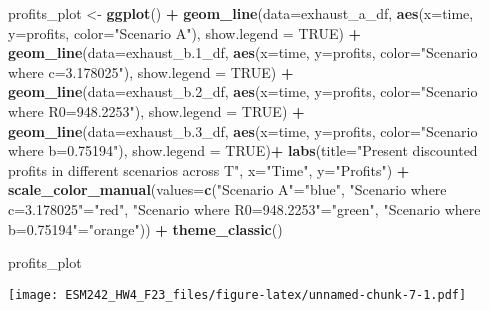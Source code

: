 \documentclass[
]{article}
\newenvironment{Shaded}{\begin{snugshade}}{\end{snugshade}}
\newcommand{\AttributeTok}[1]{\textcolor[rgb]{0.13,0.29,0.53}{#1}}
\newcommand{\ConstantTok}[1]{\textcolor[rgb]{0.56,0.35,0.01}{#1}}
\newcommand{\FloatTok}[1]{\textcolor[rgb]{0.00,0.00,0.81}{#1}}
\newcommand{\FunctionTok}[1]{\textcolor[rgb]{0.13,0.29,0.53}{\textbf{#1}}}
\newcommand{\NormalTok}[1]{#1}
\newcommand{\OtherTok}[1]{\textcolor[rgb]{0.56,0.35,0.01}{#1}}
\newcommand{\SpecialCharTok}[1]{\textcolor[rgb]{0.81,0.36,0.00}{\textbf{#1}}}
\newcommand{\StringTok}[1]{\textcolor[rgb]{0.31,0.60,0.02}{#1}}
\begin{document}
\begin{Shaded}
\begin{Highlighting}[]
\NormalTok{profits\_plot }\OtherTok{\textless{}{-}} \FunctionTok{ggplot}\NormalTok{() }\SpecialCharTok{+} 
  \FunctionTok{geom\_line}\NormalTok{(}\AttributeTok{data=}\NormalTok{exhaust\_a\_df, }\FunctionTok{aes}\NormalTok{(}\AttributeTok{x=}\NormalTok{time, }\AttributeTok{y=}\NormalTok{profits, }\AttributeTok{color=}\StringTok{"Scenario A"}\NormalTok{), }\AttributeTok{show.legend =} \ConstantTok{TRUE}\NormalTok{) }\SpecialCharTok{+}
  \FunctionTok{geom\_line}\NormalTok{(}\AttributeTok{data=}\NormalTok{exhaust\_b}\FloatTok{.1}\NormalTok{\_df, }\FunctionTok{aes}\NormalTok{(}\AttributeTok{x=}\NormalTok{time, }\AttributeTok{y=}\NormalTok{profits, }\AttributeTok{color=}\StringTok{"Scenario where c=3.178025"}\NormalTok{), }\AttributeTok{show.legend =} \ConstantTok{TRUE}\NormalTok{) }\SpecialCharTok{+}
  \FunctionTok{geom\_line}\NormalTok{(}\AttributeTok{data=}\NormalTok{exhaust\_b}\FloatTok{.2}\NormalTok{\_df, }\FunctionTok{aes}\NormalTok{(}\AttributeTok{x=}\NormalTok{time, }\AttributeTok{y=}\NormalTok{profits, }\AttributeTok{color=}\StringTok{"Scenario where R0=948.2253"}\NormalTok{), }\AttributeTok{show.legend =} \ConstantTok{TRUE}\NormalTok{) }\SpecialCharTok{+}
  \FunctionTok{geom\_line}\NormalTok{(}\AttributeTok{data=}\NormalTok{exhaust\_b}\FloatTok{.3}\NormalTok{\_df, }\FunctionTok{aes}\NormalTok{(}\AttributeTok{x=}\NormalTok{time, }\AttributeTok{y=}\NormalTok{profits, }\AttributeTok{color=}\StringTok{"Scenario where b=0.75194"}\NormalTok{), }\AttributeTok{show.legend =} \ConstantTok{TRUE}\NormalTok{)}\SpecialCharTok{+}
  \FunctionTok{labs}\NormalTok{(}\AttributeTok{title=}\StringTok{"Present discounted profits in different scenarios across T"}\NormalTok{, }\AttributeTok{x=}\StringTok{"Time"}\NormalTok{, }\AttributeTok{y=}\StringTok{"Profits"}\NormalTok{) }\SpecialCharTok{+}
  \FunctionTok{scale\_color\_manual}\NormalTok{(}\AttributeTok{values=}\FunctionTok{c}\NormalTok{(}\StringTok{"Scenario A"}\OtherTok{=}\StringTok{"blue"}\NormalTok{, }\StringTok{"Scenario where c=3.178025"}\OtherTok{=}\StringTok{"red"}\NormalTok{, }\StringTok{"Scenario where R0=948.2253"}\OtherTok{=}\StringTok{"green"}\NormalTok{, }\StringTok{"Scenario where b=0.75194"}\OtherTok{=}\StringTok{"orange"}\NormalTok{)) }\SpecialCharTok{+}
  \FunctionTok{theme\_classic}\NormalTok{()}

\NormalTok{profits\_plot}
\end{Highlighting}
\end{Shaded}

\texttt{[image: ESM242\_HW4\_F23\_files/figure-latex/unnamed-chunk-7-1.pdf]}
\end{document}
